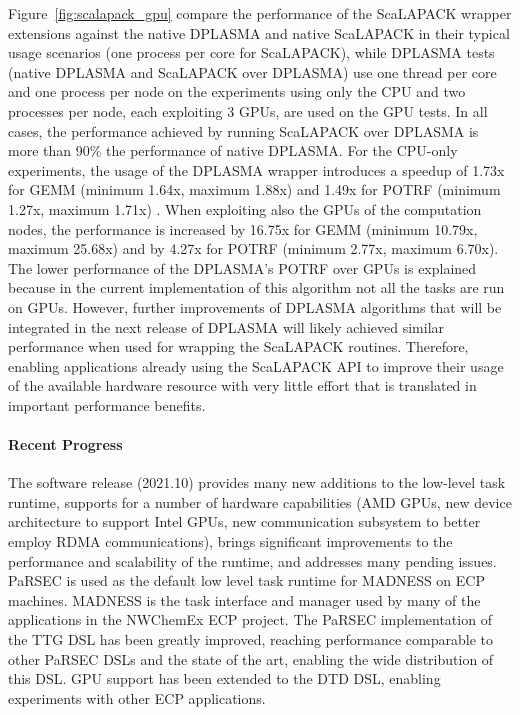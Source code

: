 Figure~\ref{fig:scalapack_gpu} compare the
performance of the ScaLAPACK wrapper extensions against the native
DPLASMA and native ScaLAPACK in their typical usage scenarios (one
process per core for ScaLAPACK),
while DPLASMA tests (native DPLASMA and ScaLAPACK over DPLASMA) use
one thread per core and one process per node on the experiments using
only the CPU and two processes per node, each exploiting 3 GPUs, are
used on the GPU tests.
%
In all cases, the performance achieved by running ScaLAPACK over
DPLASMA is more than 90\% the performance of native DPLASMA.  For the
CPU-only experiments, the usage of the DPLASMA wrapper introduces a
speedup of 1.73x for GEMM (minimum 1.64x, maximum 1.88x) and 1.49x for
POTRF (minimum 1.27x, maximum 1.71x) .  When exploiting also the GPUs
of the computation nodes, the performance is increased by 16.75x for
GEMM (minimum 10.79x, maximum 25.68x) and by 4.27x for POTRF (minimum
2.77x, maximum 6.70x).  The lower performance of the DPLASMA's POTRF
over GPUs is explained because in the current implementation of this
algorithm not all the tasks are run on GPUs. However, further
improvements of DPLASMA algorithms that will be integrated in the next
release of DPLASMA will likely achieved similar performance when used
for wrapping the ScaLAPACK routines. Therefore, enabling applications
already using the ScaLAPACK API to improve their usage of the
available hardware resource with very little effort that is translated
in important performance benefits.

%
%


\paragraph{Recent Progress}

The software release (2021.10) provides many new additions to the low-level task
runtime, supports for a number of hardware capabilities (AMD GPUs, new device
architecture to support Intel GPUs, new communication subsystem to better
employ RDMA communications), brings significant improvements to the performance
and scalability of the runtime, and addresses many pending issues. PaRSEC
is used as the default low level task runtime for MADNESS on ECP machines.
MADNESS is the task interface and manager used by many of the applications
in the NWChemEx ECP project. The PaRSEC implementation of the TTG DSL has
been greatly improved, reaching performance comparable to other PaRSEC DSLs
and the state of the art, enabling the wide distribution of this DSL. GPU
support has been extended to the DTD DSL, enabling experiments with other
ECP applications.

